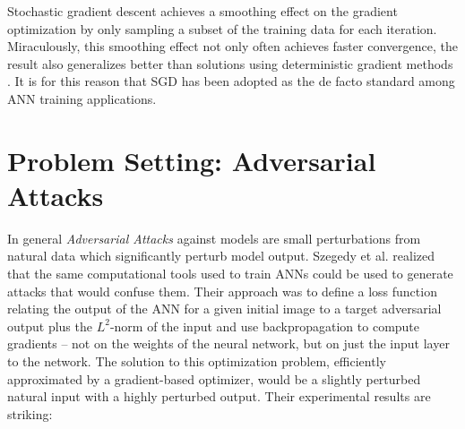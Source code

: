 \documentclass[10pt]{extarticle}
\newcounter{col}
\begin{document}
Stochastic gradient descent achieves a smoothing effect on the gradient optimization by only sampling a subset of the training data for each iteration. Miraculously, this smoothing effect not only often achieves faster convergence, the result also generalizes better than solutions using deterministic gradient methods 
\cite{HardtRS15}. It is for this reason that SGD has been adopted as the de facto standard among ANN training applications.

\section{Problem Setting: Adversarial Attacks }

In general \emph{Adversarial Attacks} against models
are small perturbations from natural data which significantly perturb
model output. 
Szegedy et al. \cite{Szegedy2013} realized that the same computational tools
used to train ANNs could be used to generate attacks that would
confuse them. Their approach was to define a loss function
relating the output of the ANN for a given initial image to a target adversarial 
output plus the $L^2$-norm of the input and use backpropagation to
compute gradients -- not on the weights of the neural network, but on
just the input layer to the network. The solution to this optimization
problem, efficiently approximated by a gradient-based optimizer, would
be a slightly perturbed natural input with a highly perturbed
output. Their experimental results are striking:\\
\end{document}
